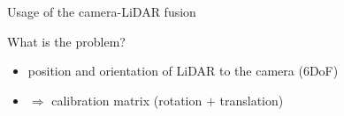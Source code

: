 \documentclass[pdf]{beamer}
\begin{document}
\begin{frame}{Usage of the camera-LiDAR fusion}
\begin{minipage}{0.18\textwidth}
\begin{figure}[h]
		\end{figure}
			\end{minipage} \begin{minipage}{0.47\textwidth}
		\begin{figure}[h]
			\centering
		\end{figure}
			\end{minipage} \begin{minipage}{0.3\textwidth}
		\begin{figure}[h]
			\centering
		\end{figure}
			\end{minipage}
			
 		\begin{block}{What is the problem?}
			\begin{itemize}
				\item position and orientation of LiDAR to the camera ($6$DoF)
				\item $\Rightarrow$ calibration matrix (rotation $+$ translation)
			\end{itemize}
 		\end{block}
	\end{frame}
		
\end{document}
